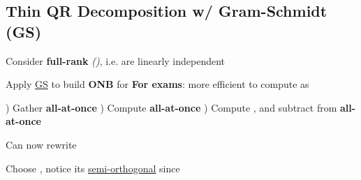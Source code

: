 \subsection*{Thin QR Decomposition w/ Gram-Schmidt (GS)}


Consider \textbf{full-rank}
\emph{()},
i.e. 
are linearly independent

\begin{itemize}

      \vItem
            Apply \ul{GS} 
            to build \textbf{ONB}
            for 
      \vItem
            \textbf{For exams}: more efficient to compute as

            \begin{enumerate}
                  )
                        Gather
                        \textbf{all-at-once}
                  )
                        Compute
                        \textbf{all-at-once}
                  )
                        Compute , and
                        subtract from  \textbf{all-at-once}
            \end{enumerate}
      \vItem
            Can now rewrite
\end{itemize}

\hSep %

Choose
,
notice its \ul{semi-orthogonal} since

